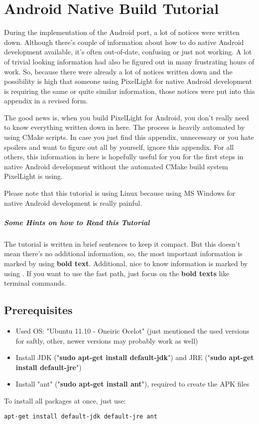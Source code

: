 \chapter{Android Native Build Tutorial}
\label{Appendix:AndroidNativeBuildTutorial}
During the implementation of the Android port, a lot of notices were written down. Although there's couple of information about how to do native Android development available, it's often out-of-date, confusing or just not working. A lot of trivial looking information had also be figured out in many frustrating hours of work. So, because there were already a lot of notices written down and the possibility is high that someone using PixelLight for native Android development is requiring the same or quite similar information, those notices were put into this appendix in a revised form.

The good news is, when you build PixelLight for Android, you don't really need to know everything written down in here. The process is heavily automated by using CMake scripts. In case you just find this appendix, unnecessary or you hate spoilers and want to figure out all by yourself, ignore this appendix. For all others, this information in here is hopefully useful for you for the first steps in native Android development without the automated CMake build system PixelLight is using.

Please note that this tutorial is using Linux because using MS Windows for native Android development is really painful.


\paragraph{Some Hints on how to Read this Tutorial}
The tutorial is written in brief sentences to keep it compact. But this doesn't mean there's no additional information, so, the most important information is marked by using \textbf{bold text}. Additional, nice to know information is marked by using \textrightarrow. If you want to use the fast path, just focus on the \textbf{bold texts} like terminal commands.




\section{Prerequisites}
\begin{itemize}
\item{Used \ac{OS}: "Ubuntu 11.10 - Oneiric Ocelot" (just mentioned the used versions for saftly, other, newer versions may probably work as well)}
\item{Install \ac{JDK} ("\textbf{sudo apt-get install default-jdk}") and \ac{JRE} ("\textbf{sudo apt-get install default-jre}")}
\item{Install "ant" ("\textbf{sudo apt-get install ant}"), required to create the \ac{APK} files}
\end{itemize}
To install all packages at once, just use: 
\begin{lstlisting}[language=sh]
apt-get install default-jdk default-jre ant
\end{lstlisting}



